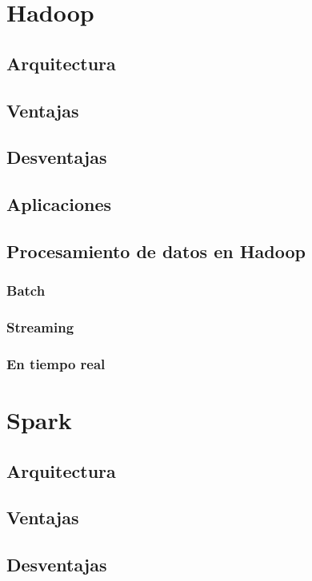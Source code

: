 \documentclass[12pt]{article}
\begin{document}
\section{Hadoop}



\subsection{Arquitectura}
\subsection{Ventajas}
\subsection{Desventajas}
\subsection{Aplicaciones}

\subsection{Procesamiento de datos en Hadoop}
\subsubsection{Batch}
\subsubsection{Streaming}
\subsubsection{En tiempo real}


\section{Spark}

\subsection{Arquitectura}
\subsection{Ventajas}
\subsection{Desventajas}
\end{document}

